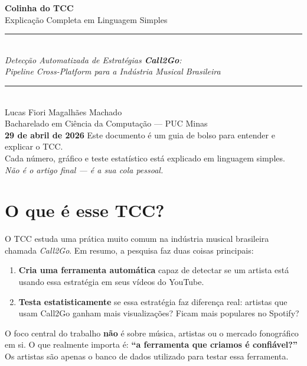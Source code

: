 \documentclass[12pt,a4paper]{article}
\newcommand{\ok}[1]{\textcolor{verde}{\textbf{#1}}}
\newcommand{\term}[1]{\textcolor{roxo}{\textit{#1}}}
\begin{document}
\begin{titlepage}
\centering
\vspace*{2cm}
{\Huge\textbf{Colinha do TCC}}\\[0.7em]
{\Large Explicação Completa em Linguagem Simples}\\[2em]
\rule{\textwidth}{1pt}\\[0.8em]
{\large\itshape
  Detecção Automatizada de Estratégias \textbf{Call2Go}:\\[0.3em]
  Pipeline Cross-Platform para a Indústria Musical Brasileira
}\\[0.8em]
\rule{\textwidth}{1pt}\\[3em]
{\large Lucas Fiori Magalhães Machado}\\[0.4em]
{\normalsize Bacharelado em Ciência da Computação --- PUC Minas}\\[4em]
{\large\textbf{29 de abril de 2026}}
\vfill
{\small
  Este documento é um guia de bolso para entender e explicar o TCC.\\
  Cada número, gráfico e teste estatístico está explicado em linguagem simples.\\[0.5em]
  \textit{Não é o artigo final --- é a sua cola pessoal.}
}
\end{titlepage}

\tableofcontents
\newpage

\section{O que é esse TCC?}

O TCC estuda uma prática muito comum na indústria musical brasileira chamada
\term{Call2Go}. Em resumo, a pesquisa faz duas coisas principais:

\begin{enumerate}
  \item \textbf{Cria uma ferramenta automática} capaz de detectar se um artista
        está usando essa estratégia em seus vídeos do YouTube.
  \item \textbf{Testa estatisticamente} se essa estratégia faz diferença real:
        artistas que usam Call2Go ganham mais visualizações? Ficam mais populares
        no Spotify?
\end{enumerate}

O foco central do trabalho \textbf{não} é sobre música, artistas ou o mercado
fonográfico em si. O que realmente importa é: \ok{``a ferramenta que criamos é
confiável?''} Os artistas são apenas o banco de dados utilizado para testar essa
ferramenta.
\end{document}
